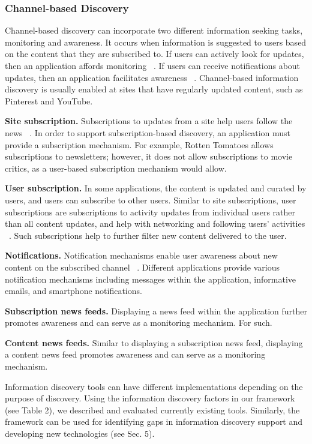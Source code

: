 {\subsubsection{Channel-based Discovery}
Channel-based discovery can incorporate two different information seeking tasks, monitoring and awareness. It occurs when information is suggested to users based on the content that they are subscribed to. If users can actively look for updates, then an application affords monitoring ~\cite{morrison}. If users can receive notifications about updates, then an application facilitates awareness ~\cite{bates2002, bates1986}. Channel-based information discovery is usually enabled at sites that have regularly updated content, such as Pinterest and YouTube.                            


\textbf{Site subscription.} Subscriptions to updates from a site help users follow the news ~\cite{java}. In order to support subscription-based discovery, an application must provide a subscription mechanism. For example, Rotten Tomatoes allows subscriptions to newsletters; however, it does not allow subscriptions to movie critics, as a user-based subscription mechanism would allow. 

\textbf{User subscription.} In some applications, the content is updated and curated by users, and users can subscribe to other users. Similar to site subscriptions, user subscriptions are subscriptions to activity updates from individual users rather than all content updates, and help with networking and following users' activities ~\cite{millen}. Such subscriptions help to further filter new content delivered to the user. 

\textbf{Notifications.} Notification mechanisms enable user awareness about new content on the subscribed channel ~\cite{millen}. Different applications provide various notification mechanisms including messages within the application, informative emails, and smartphone notifications.

\textbf{Subscription news feeds.} Displaying a news feed within the application further promotes awareness and can serve as a monitoring mechanism. For such. 

\textbf{Content news feeds.} Similar to displaying a subscription news feed, displaying a content news feed promotes awareness and can serve as a monitoring mechanism.

Information discovery tools can have different implementations depending on the purpose of discovery. Using the information discovery factors in our framework (see Table 2), we described and evaluated currently existing tools. Similarly, the framework can be used for identifying gaps in information discovery support and developing new technologies (see Sec. 5).   \\

} %


